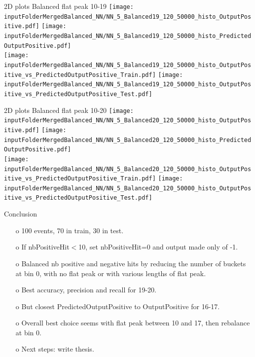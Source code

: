 \documentclass{beamer}
\begin{document}
\begin{frame}{2D plots Balanced flat peak 10-19}
\texttt{[image: \\inputFolderMergedBalanced\_NN/NN\_5\_Balanced19\_120\_50000\_histo\_OutputPositive.pdf]}
\texttt{[image: \\inputFolderMergedBalanced\_NN/NN\_5\_Balanced19\_120\_50000\_histo\_PredictedOutputPositive.pdf]}\\
\texttt{[image: \\inputFolderMergedBalanced\_NN/NN\_5\_Balanced19\_120\_50000\_histo\_OutputPositive\_vs\_PredictedOutputPositive\_Train.pdf]}
\texttt{[image: \\inputFolderMergedBalanced\_NN/NN\_5\_Balanced19\_120\_50000\_histo\_OutputPositive\_vs\_PredictedOutputPositive\_Test.pdf]}
\end{frame}
\clearpage

\begin{frame}{2D plots Balanced flat peak 10-20}
\texttt{[image: \\inputFolderMergedBalanced\_NN/NN\_5\_Balanced20\_120\_50000\_histo\_OutputPositive.pdf]}
\texttt{[image: \\inputFolderMergedBalanced\_NN/NN\_5\_Balanced20\_120\_50000\_histo\_PredictedOutputPositive.pdf]}\\
\texttt{[image: \\inputFolderMergedBalanced\_NN/NN\_5\_Balanced20\_120\_50000\_histo\_OutputPositive\_vs\_PredictedOutputPositive\_Train.pdf]}
\texttt{[image: \\inputFolderMergedBalanced\_NN/NN\_5\_Balanced20\_120\_50000\_histo\_OutputPositive\_vs\_PredictedOutputPositive\_Test.pdf]}
\end{frame}
\clearpage

\begin{frame}{Conclusion}
\begin{enumerate}
\item[o] 100 events, 70 in train, 30 in test.
\item[o] If nbPositiveHit$<$10, set nbPositiveHit=0 and output made only of -1.
\item[o] Balanced nb positive and negative hits by reducing the number of buckets at bin 0, with no flat peak or with various lengths of flat peak.
\item[o] Best accuracy, precision and recall for 19-20.
\item[o] But closest PredictedOutputPositive to OutputPositive for 16-17.
\item[o] Overall best choice seems with flat peak between 10 and 17, then rebalance at bin 0. 
\item[o] Next steps: write thesis.
\end{enumerate}
\end{frame}
\clearpage
\end{document}
